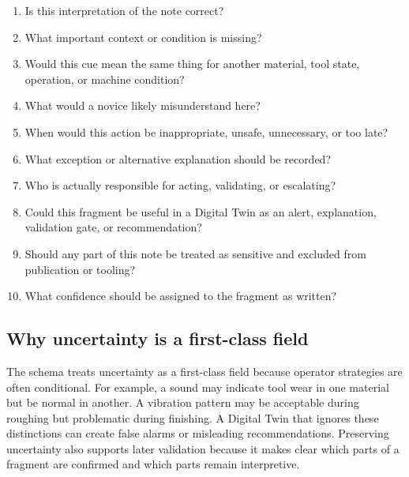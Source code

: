 \begin{enumerate}
    \item Is this interpretation of the note correct?
    \item What important context or condition is missing?
    \item Would this cue mean the same thing for another material, tool state, operation, or machine condition?
    \item What would a novice likely misunderstand here?
    \item When would this action be inappropriate, unsafe, unnecessary, or too late?
    \item What exception or alternative explanation should be recorded?
    \item Who is actually responsible for acting, validating, or escalating?
    \item Could this fragment be useful in a Digital Twin as an alert, explanation, validation gate, or recommendation?
    \item Should any part of this note be treated as sensitive and excluded from publication or tooling?
    \item What confidence should be assigned to the fragment as written?
\end{enumerate}

\subsection{Why uncertainty is a first-class field}

The schema treats uncertainty as a first-class field because operator strategies are often conditional. For example, a sound may indicate tool wear in one material but be normal in another. A vibration pattern may be acceptable during roughing but problematic during finishing. A Digital Twin that ignores these distinctions can create false alarms or misleading recommendations. Preserving uncertainty also supports later validation because it makes clear which parts of a fragment are confirmed and which parts remain interpretive.
